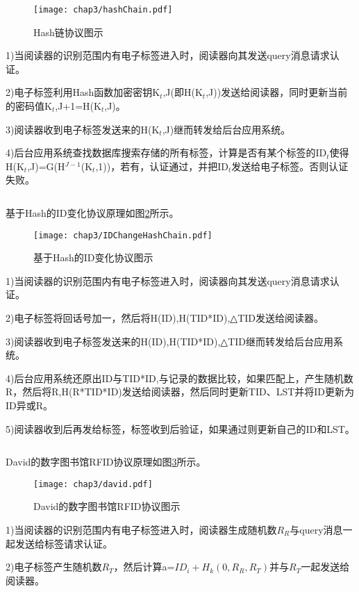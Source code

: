 \begin{figure}[!htp]
	\centering
	\texttt{[image: chap3/hashChain.pdf]}
	\caption{Hash链协议图示}\label{fig:Hash链协议图示}
\end{figure}

1)当阅读器的识别范围内有电子标签进入时，阅读器向其发送query消息请求认证。

2)电子标签利用Hash函数加密密钥K$_{t}$,J(即H(K$_{t}$,J))发送给阅读器，同时更新当前的密码值K$_{t}$,J+1=H(K$_{t}$,J)。

3)阅读器收到电子标签发送来的H(K$_{t}$,J)继而转发给后台应用系统。

4)后台应用系统查找数据库搜索存储的所有标签，计算是否有某个标签的ID$_{t}$使得H(K$_{t}$,J)=G(H$^{J-1}$(K$_{t}$,1))，若有，认证通过，并把ID$_{t}$发送给电子标签。否则认证失败。

\[\]

基于Hash的ID变化协议原理如图\ref{fig:基于Hash的ID变化协议图示}所示。

\begin{figure}[!htp]
	\centering
	\texttt{[image: chap3/IDChangeHashChain.pdf]}
	\caption{基于Hash的ID变化协议图示}\label{fig:基于Hash的ID变化协议图示}
\end{figure}

1)当阅读器的识别范围内有电子标签进入时，阅读器向其发送query消息请求认证。

2)电子标签将回话号加一，然后将H(ID),H(TID*ID),△TID发送给阅读器。

3)阅读器收到电子标签发送来的H(ID),H(TID*ID),△TID继而转发给后台应用系统。

4)后台应用系统还原出ID与TID*ID,与记录的数据比较，如果匹配上，产生随机数R，然后将R,H(R*TID*ID)发送给阅读器，然后同时更新TID、LST并将ID更新为ID异或R。

5)阅读器收到后再发给标签，标签收到后验证，如果通过则更新自己的ID和LST。

\[\]

David的数字图书馆RFID协议原理如图\ref{fig:David的数字图书馆RFID协议图示}所示。

\begin{figure}[!htp]
	\centering
	\texttt{[image: chap3/david.pdf]}
	\caption{David的数字图书馆RFID协议图示}\label{fig:David的数字图书馆RFID协议图示}
\end{figure}

1)当阅读器的识别范围内有电子标签进入时，阅读器生成随机数$R_{R}$与query消息一起发送给标签请求认证。

2)电子标签产生随机数$R_{T}$，然后计算a=$ID_{i}+H_{k}(0,R_{R},R_{T})$并与$R_{T}$一起发送给阅读器。

